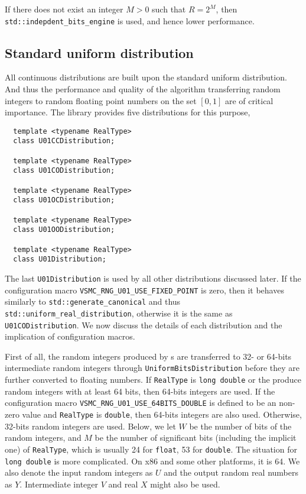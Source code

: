 If there does not exist an integer $M > 0$ such that $R = 2^M$, then
\verb|std::indepdent_bits_engine| is used, and hence lower performance.

\subsection{Standard uniform distribution}
\label{sub:Standard uniform distribution}

All continuous distributions are built upon the standard uniform distribution.
And thus the performance and quality of the algorithm transferring random
integers to random floating point numbers on the set $[0, 1]$ are of critical
importance. The library provides five distributions for this purpose,
\begin{Verbatim}
  template <typename RealType>
  class U01CCDistribution;

  template <typename RealType>
  class U01CODistribution;

  template <typename RealType>
  class U01OCDistribution;

  template <typename RealType>
  class U01OODistribution;

  template <typename RealType>
  class U01Distribution;
\end{Verbatim}
The last \verb|U01Distribution| is used by all other distributions discussed
later. If the configuration macro \verb|VSMC_RNG_U01_USE_FIXED_POINT| is zero,
then it behaves similarly to \verb|std::generate_canonical| and thus
\verb|std::uniform_real_distribution|, otherwise it is the same as
\verb|U01CODistribution|. We now discuss the details of each distribution and
the implication of configuration macros.

First of all, the random integers produced by \rng{}s are transferred to 32- or
64-bits intermediate random integers through \verb|UniformBitsDistribution|
before they are further converted to floating numbers. If \verb|RealType| is
\verb|long double| or the \rng{} produce random integers with at least 64 bits,
then 64-bits integers are used. If the configuration macro
\verb|VSMC_RNG_U01_USE_64BITS_DOUBLE| is defined to be an non-zero value and
\verb|RealType| is \verb|double|, then 64-bits integers are also used.
Otherwise, 32-bits random integers are used. Below, we let $W$ be the number of
bits of the random integers, and $M$ be the number of significant bits
(including the implicit one) of \verb|RealType|, which is usually 24 for
\verb|float|, 53 for \verb|double|. The situation for \verb|long double| is
more complicated. On x86 and some other platforms, it is 64. We also denote the
input random integers as $U$ and the output random real numbers as $Y$.
Intermediate integer $V$ and real $X$ might also be used.

